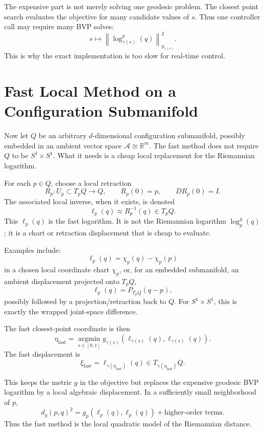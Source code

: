 \documentclass[11pt]{article}
\begin{document}
The expensive part is not merely solving one geodesic problem. The closest
point search evaluates the objective for many candidate values of \(s\). Thus
one controller call may require many BVP solves:
\[
    s
    \longmapsto
    \left\|
        \log^g_{\gamma(s)}(q)
    \right\|^2_{g_{\gamma(s)}}.
\]
This is why the exact implementation is too slow for real-time control.

\section{Fast Local Method on a Configuration Submanifold}

Now let \(Q\) be an arbitrary \(d\)-dimensional configuration submanifold,
possibly embedded in an ambient vector space \(\mathcal A \cong \mathbb R^m\).
The fast method does not require \(Q\) to be \(S^1\times S^1\).  What it needs
is a cheap local replacement for the Riemannian logarithm.

For each \(p\in Q\), choose a local retraction
\[
    R_p : U_p \subset T_pQ \to Q,
    \qquad
    R_p(0)=p,
    \qquad
    D R_p(0)=I.
\]
The associated local inverse, when it exists, is denoted
\[
    \ell_p(q) \approx R_p^{-1}(q) \in T_pQ.
\]
This \(\ell_p(q)\) is the fast logarithm.  It is not the Riemannian logarithm
\(\log^g_p(q)\); it is a chart or retraction displacement that is cheap to
evaluate.

Examples include:
\[
    \ell_p(q)
    =
    \chi_p(q)-\chi_p(p)
\]
in a chosen local coordinate chart \(\chi_p\), or, for an embedded
submanifold, an ambient displacement projected onto \(T_pQ\),
\[
    \ell_p(q)
    =
    P_{T_pQ}(q-p),
\]
possibly followed by a projection/retraction back to \(Q\).  For
\(S^1\times S^1\), this is exactly the wrapped joint-space difference.

The fast closest-point coordinate is then
\[
    \eta_{\mathrm{fast}}
    =
    \operatorname*{argmin}_{s\in[0,1]}
    g_{\gamma(s)}
    \left(
        \ell_{\gamma(s)}(q),
        \ell_{\gamma(s)}(q)
    \right).
\]
The fast displacement is
\[
    \xi_{\mathrm{fast}}
    =
    \ell_{\gamma(\eta_{\mathrm{fast}})}(q)
    \in T_{\gamma(\eta_{\mathrm{fast}})}Q.
\]

This keeps the metric \(g\) in the objective but replaces the expensive
geodesic BVP logarithm by a local algebraic displacement.  In a sufficiently
small neighborhood of \(p\),
\[
    d_g(p,q)^2
    =
    g_p(\ell_p(q),\ell_p(q))
    +
    \text{higher-order terms}.
\]
Thus the fast method is the local quadratic model of the Riemannian distance.
\end{document}
